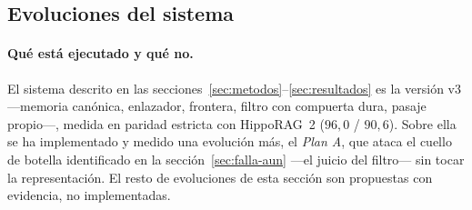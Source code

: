 \documentclass[11pt,a4paper]{article}
\newcommand{\hippo}{HippoRAG~2}
\begin{document}
\subsection{Evoluciones del sistema}
\label{sec:evoluciones}

\paragraph{Qué está ejecutado y qué no.}
El sistema descrito en las secciones~\ref{sec:metodos}--\ref{sec:resultados}
es la versión v3 ---memoria canónica, enlazador, frontera, filtro con
compuerta dura, pasaje propio---, medida en paridad estricta con \hippo{}
($96{,}0$ / $90{,}6$). Sobre ella se ha implementado y medido una
evolución más, el \emph{Plan A}, que ataca el cuello de botella
identificado en la sección~\ref{sec:falla-aun} ---el juicio del filtro---
sin tocar la representación. El resto de evoluciones de esta sección son
propuestas con evidencia, no implementadas.
\end{document}
